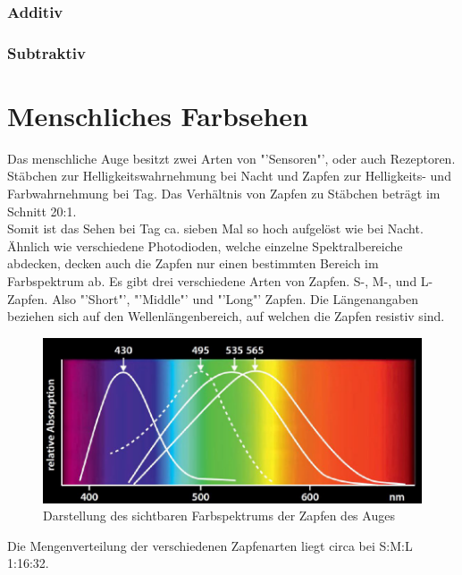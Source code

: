 \documentclass[11pt]{scrartcl}
\begin{document}
\subsubsection{Additiv}
\subsubsection{Subtraktiv}
\clearpage

\section{Menschliches Farbsehen}
Das menschliche Auge besitzt zwei Arten von "'Sensoren"', oder auch Rezeptoren. Stäbchen zur Helligkeitswahrnehmung bei Nacht und
Zapfen zur Helligkeits- und Farbwahrnehmung bei Tag. Das Verhältnis von Zapfen zu Stäbchen beträgt im Schnitt 20:1.\\
Somit ist das Sehen bei Tag ca. sieben Mal so hoch aufgelöst wie bei Nacht.\\
Ähnlich wie verschiedene Photodioden, welche einzelne Spektralbereiche abdecken, decken auch die Zapfen nur einen
bestimmten Bereich im Farbspektrum ab. Es gibt drei verschiedene Arten von Zapfen. S-, M-, und L-Zapfen. Also "'Short"',
"'Middle"' und "'Long"' Zapfen. Die Längenangaben beziehen sich auf den Wellenlängenbereich, auf welchen die Zapfen
resistiv sind.\\
\begin{figure}[H]
    \includegraphics[width=\textwidth]{images/eye_spectrum.png}
    \caption{Darstellung des sichtbaren Farbspektrums der Zapfen des Auges}\label{fig:eye_spectrum}
\end{figure}
Die Mengenverteilung der verschiedenen Zapfenarten liegt circa bei S:M:L 1:16:32.
\clearpage

\end{document}
